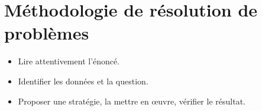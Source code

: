 \chapter{Méthodologie de résolution de problèmes}
\begin{itemize}
\item Lire attentivement l'énoncé.
\item Identifier les données et la question.
\item Proposer une stratégie, la mettre en œuvre, vérifier le résultat.
\end{itemize}
